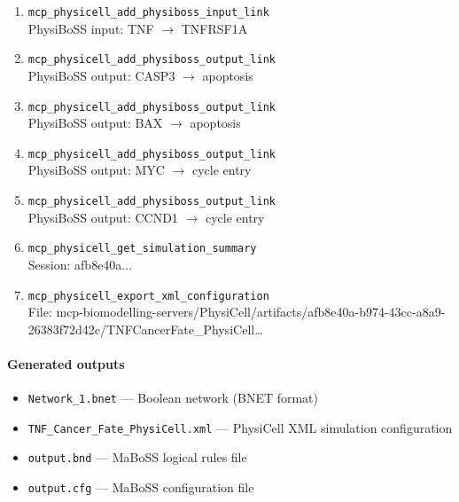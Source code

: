 \begin{enumerate}
\hfill\\
\RaggedRight PhysiBoSS input: TNF \ensuremath{\rightarrow} TNF
\item[29.] \texttt{mcp\_\allowbreak{}physicell\_\allowbreak{}add\_\allowbreak{}physiboss\_\allowbreak{}input\_\allowbreak{}link}
\hfill\\
\RaggedRight PhysiBoSS input: TNF \ensuremath{\rightarrow} TNFRSF1A
\item[30.] \texttt{mcp\_\allowbreak{}physicell\_\allowbreak{}add\_\allowbreak{}physiboss\_\allowbreak{}output\_\allowbreak{}link}
\hfill\\
\RaggedRight PhysiBoSS output: CASP3 \ensuremath{\rightarrow} apoptosis
\item[31.] \texttt{mcp\_\allowbreak{}physicell\_\allowbreak{}add\_\allowbreak{}physiboss\_\allowbreak{}output\_\allowbreak{}link}
\hfill\\
\RaggedRight PhysiBoSS output: BAX \ensuremath{\rightarrow} apoptosis
\item[32.] \texttt{mcp\_\allowbreak{}physicell\_\allowbreak{}add\_\allowbreak{}physiboss\_\allowbreak{}output\_\allowbreak{}link}
\hfill\\
\RaggedRight PhysiBoSS output: MYC \ensuremath{\rightarrow} cycle entry
\item[33.] \texttt{mcp\_\allowbreak{}physicell\_\allowbreak{}add\_\allowbreak{}physiboss\_\allowbreak{}output\_\allowbreak{}link}
\hfill\\
\RaggedRight PhysiBoSS output: CCND1 \ensuremath{\rightarrow} cycle entry
\item[34.] \texttt{mcp\_\allowbreak{}physicell\_\allowbreak{}get\_\allowbreak{}simulation\_\allowbreak{}summary}
\hfill\\
\RaggedRight Session: afb8e40a...
\item[35.] \texttt{mcp\_\allowbreak{}physicell\_\allowbreak{}export\_\allowbreak{}xml\_\allowbreak{}configuration}
\hfill\\
\RaggedRight File: mcp-biomodelling-servers/PhysiCell/artifacts/afb8e40a-b974-43cc-a8a9-26383f72d42c/TNFCancerFate\_PhysiCell\ldots{}
\end{enumerate}
\endgroup

\paragraph{Generated outputs}
\begin{itemize}
\item \texttt{Network\_\allowbreak{}1.\allowbreak{}bnet} — Boolean network (BNET format)
\item \texttt{TNF\_\allowbreak{}Cancer\_\allowbreak{}Fate\_\allowbreak{}PhysiCell.\allowbreak{}xml} — PhysiCell XML simulation configuration
\item \texttt{output.\allowbreak{}bnd} — MaBoSS logical rules file
\item \texttt{output.\allowbreak{}cfg} — MaBoSS configuration file
\end{itemize}
